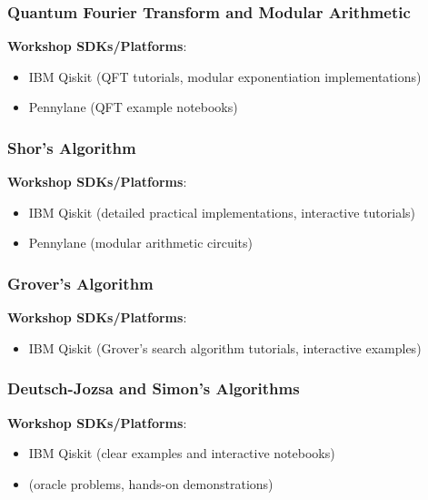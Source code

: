 \subsubsection{Quantum Fourier Transform and Modular Arithmetic}

\textbf{Workshop SDKs/Platforms}:

\begin{itemize}
	\item IBM Qiskit (QFT tutorials, modular exponentiation implementations)
	\item Pennylane (QFT example notebooks)
\end{itemize}


\subsubsection{Shor's Algorithm}

\textbf{Workshop SDKs/Platforms}:

\begin{itemize}
	\item IBM Qiskit (detailed practical implementations, interactive tutorials)
	\item Pennylane (modular arithmetic circuits)
\end{itemize}


\subsubsection{Grover’s Algorithm}

\textbf{Workshop SDKs/Platforms}:

\begin{itemize}
	\item IBM Qiskit (Grover's search algorithm tutorials, interactive examples)
\end{itemize}


\subsubsection{Deutsch-Jozsa and Simon’s Algorithms}

\textbf{Workshop SDKs/Platforms}:

\begin{itemize}
	\item IBM Qiskit (clear examples and interactive notebooks)
	\item (oracle problems, hands-on demonstrations)
\end{itemize}


